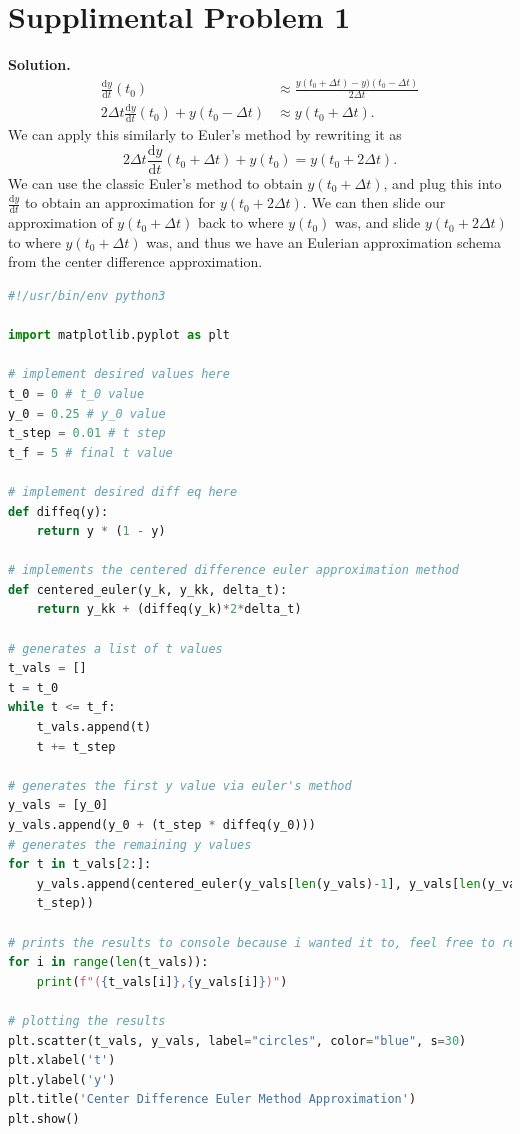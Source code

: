 \documentclass[11pt, letterpaper]{report}
\newenvironment{soln}[1][]{\noindent\textbf{Solution. }}{\hfill\qedsymbol}
\begin{document}
\section*{Supplimental Problem 1}
\begin{soln}
	\begin{align*}
		\frac{\mathrm{d}y}{\mathrm{d}t} (t_0)&\approx \frac{y(t_0+\Delta t)-y)(t_0-\Delta t)}{2\Delta t}\\
		2\Delta t \frac{\mathrm{d}y}{\mathrm{d}t}(t_0) +y(t_0-\Delta t)&\approx y(t_0+\Delta t)
	.\end{align*}
	We can apply this similarly to Euler's method by rewriting it as
	\[
		2\Delta t \frac{\mathrm{d}y}{\mathrm{d}t} (t_0+\Delta t)+y(t_0)=y(t_0+2\Delta t)
	.\]
	We can use the classic Euler's method to obtain $y(t_0+\Delta t)$, and plug this into $\frac{\mathrm{d}y}{\mathrm{d}t} $ to obtain an approximation for $y(t_0+2\Delta t)$. We can then slide our approximation of $y(t_0+\Delta t)$ back to where $y(t_0)$ was, and slide $y(t_0+2\Delta t)$ to where $y(t_0+\Delta t)$ was, and thus we have an Eulerian approximation schema from the center difference approximation.
	\begin{lstlisting}[language=python]
#!/usr/bin/env python3

import matplotlib.pyplot as plt

# implement desired values here
t_0 = 0 # t_0 value
y_0 = 0.25 # y_0 value
t_step = 0.01 # t step
t_f = 5 # final t value

# implement desired diff eq here
def diffeq(y):
    return y * (1 - y)

# implements the centered difference euler approximation method
def centered_euler(y_k, y_kk, delta_t):
    return y_kk + (diffeq(y_k)*2*delta_t)

# generates a list of t values
t_vals = []
t = t_0
while t <= t_f:
    t_vals.append(t)
    t += t_step

# generates the first y value via euler's method
y_vals = [y_0]
y_vals.append(y_0 + (t_step * diffeq(y_0)))
# generates the remaining y values
for t in t_vals[2:]:
    y_vals.append(centered_euler(y_vals[len(y_vals)-1], y_vals[len(y_vals) - 2],
    t_step))

# prints the results to console because i wanted it to, feel free to remove
for i in range(len(t_vals)):
    print(f"({t_vals[i]},{y_vals[i]})")

# plotting the results
plt.scatter(t_vals, y_vals, label="circles", color="blue", s=30)
plt.xlabel('t')
plt.ylabel('y')
plt.title('Center Difference Euler Method Approximation')
plt.show()


\end{lstlisting}
\end{soln}
\end{document}
